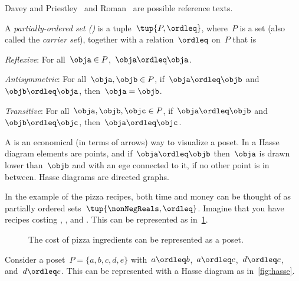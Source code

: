 Davey and Priestley~\cite{davey02}
and Roman~\cite{roman08} are possible reference texts.



\begin{definition}
    \label{def:poset}
    A \emph{partially-ordered set ()} is a tuple~$\tup{P,\ordleq}$,
    where~$P$ is a set (also called the \emph{carrier set}), together with a
    relation~$\ordleq$ on~$P$ that is
    \begin{compactenum}
        \item \emph{Reflexive}: For all~$\obja\in P$,~$\obja \ordleq \obja$.
        \item \emph{Antisymmetric}: For all~$\obja,\objb\in P$, if~$\obja\ordleq \objb$ and~$\objb\ordleq \obja$, then~$\obja=\objb$.
        \item \emph{Transitive}: For all~$\obja,\objb,\objc\in P$, if~$\obja\ordleq \objb$ and~$\objb\ordleq \objc$, then~$\obja\ordleq \objc$.
    \end{compactenum}
\end{definition}

A \emph{} is an economical (in terms of arrows) way to visualize a poset. In a Hasse diagram elements are points, and if~$\obja \ordleq \objb$ then~$\obja$ is drawn lower than~$\objb$ and with an ege connected to it, if no other point is in between. Hasse diagrams are directed graphs.

In the example of the pizza recipes, both time and money can be thought of as partially ordered sets~$\tup{\nonNegReals,\ordleq}$. Imagine that you have recipes costing \unit[1]{\stdcurr}, \unit[2]{\stdcurr}, and \unit[3]{\stdcurr}. This can be represented as in~\cref{fig:hassepizza}.

\begin{figure}[h!]
    \begin{center}
        \caption{The cost of pizza ingredients can be represented as a poset.\label{fig:hassepizza}}
    \end{center}
\end{figure}


\begin{example}
    Consider a poset~$P=\{a,b,c,d,e\}$ with~$a\ordleq b$,~$a\ordleq c$,~$d\ordleq c$, and~$d\ordleq e$. This can be represented with a Hasse diagram as in~\cref{fig:hasse}.
\end{example}

